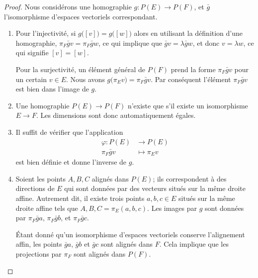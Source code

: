 \begin{proof}
    Nous considérons une homographie \( g\colon P(E)\to P(F)\), et \( \bar g\) l'isomorphisme d'espaces vectoriels correspondant.
    \begin{enumerate}
        \item
            Pour l'injectivité, si \( g\big( [v] \big)=g\big( [w] \big)\) alors en utilisant la définition d'une homographie, \( \pi_F\bar gv=\pi_F\bar gw\), ce qui implique que \( \bar gv=\lambda\bar gw\), et donc \( v=\lambda w\), ce qui signifie \( [v]=[w]\).

            Pour la surjectivité, un élément général de \( P(F)\) prend la forme \( \pi_F\bar gv\) pour un certain \( v\in E\). Nous avons \( g\big( \pi_Ev \big)=\pi_F\bar gv\). Par conséquent l'élément \( \pi_F\bar gv\) est bien dans l'image de \( g\).

        \item
            Une homographie \( P(E)\to P(F)\) n'existe que s'il existe un isomorphisme \( E\to F\). Les dimensions sont donc automatiquement égales.
        \item
            Il suffit de vérifier que l'application
            \begin{equation}
                \begin{aligned}
                    \varphi\colon P(E)&\to P(E) \\
                    \pi_F\bar gv&\mapsto \pi_Ev
                \end{aligned}
            \end{equation}
            est bien définie et donne l'inverse de \( g\).
        \item
            Soient les points \( A,B,C\) alignés dans \( P(E)\); ils correspondent à des directions de \( E\) qui sont données par des vecteurs situés sur la même droite affine. Autrement dit, il existe trois points \( a,b,c\in E\) situés sur la même droite affine tels que \( A,B,C=\pi_E(a,b,c)\). Les images par \( g\) sont données par \( \pi_F\bar ga\), \( \pi_F\bar gb\), et \( \pi_F\bar gc\).

            Étant donné qu'un isomorphisme d'espaces vectoriels conserve l'alignement affin, les points \( \bar ga\), \( \bar gb\) et \( \bar gc\) sont alignés dans \( F\). Cela implique que les projections par \( \pi_F\) sont alignés dans \( P(F)\).
    \end{enumerate}
\end{proof}

